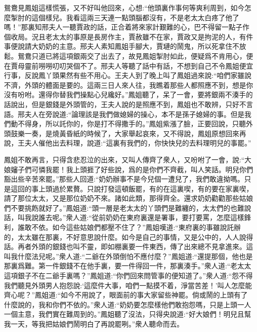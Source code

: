 \begin{parag}
    鴛鴦見鳳姐這樣慌張，又不好叫他回來，心想:“他頭裏作事何等爽利周到，如今怎麼掣肘的這個樣兒。我看這兩三天連一點頭腦都沒有，不是老太太白疼了他了嗎！”那裏知邢夫人一聽賈政的話，正合着將來家計艱難的心，巴不得留一點子作個收局。況且老太太的事原是長房作主，賈赦雖不在家，賈政又是拘泥的人，有件事便說請大奶奶的主意。邢夫人素知鳳姐手腳大，賈璉的鬧鬼，所以死拿住不放鬆。鴛鴦只道已將這項銀兩交了出去了，故見鳳姐掣肘如此，便疑爲不肯用心，便在賈母靈前嘮嘮叨叨哭個不了。邢夫人等聽了話中有話，不想到自己不令鳳姐便宜行事，反說鳳丫頭果然有些不用心。王夫人到了晚上叫了鳳姐過來說:“咱們家雖說不濟，外頭的體面是要的。這兩三日人來人往，我瞧着那些人都照應不到，想是你沒有吩咐。還得你替我們操點心兒纔好。”鳳姐聽了，呆了一會，要將銀兩不湊手的話說出，但是銀錢是外頭管的，王夫人說的是照應不到，鳳姐也不敢辨，只好不言語。邢夫人在旁說道:“論理該是我們做媳婦的操心，本不是孫子媳婦的事。但是我們動不得身，所以託你的，你是打不得撒手的。”鳳姐紫漲了臉，正要回說，只聽外頭鼓樂一奏，是燒黃昏紙的時候了，大家舉起哀來，又不得說，鳳姐原想回來再說，王夫人催他出去料理，說道:“這裏有我們的，你快快兒的去料理明兒的事罷。”
\end{parag}


\begin{parag}
    鳳姐不敢再言，只得含悲忍泣的出來，又叫人傳齊了衆人，又吩咐了一會，說:“大娘嬸子們可憐我罷！我上頭捱了好些說，爲的是你們不齊截，叫人笑話。明兒你們豁出些辛苦來罷。”那些人回道:“奶奶辦事不是今兒個一遭兒了，我們敢違拗嗎。只是這回的事上頭過於累贅。只說打發這頓飯罷，有的在這裏喫，有的要在家裏喫，請了那位太太，又是那位奶奶不來。諸如此類，那得齊全。還求奶奶勸勸那些姑娘們不要挑飭就好了。”鳳姐道:“頭一層是老太太的丫頭們是難纏的，太太們的也難說話，叫我說誰去呢。”衆人道:“從前奶奶在東府裏還是署事，要打要罵，怎麼這樣鋒利，誰敢不依。如今這些姑娘們都壓不住了？”鳳姐嘆道:“東府裏的事雖說託辦的，太太雖在那裏，不好意思說什麼。如今是自己的事情，又是公中的，人人說得話。再者外頭的銀錢也叫不靈，即如棚裏要一件東西，傳了出來總不見拿進來。這叫我什麼法兒呢。”衆人道:“二爺在外頭倒怕不應付麼？”鳳姐道:“還提那個，他也是那裏爲難。第一件銀錢不在他手裏，要一件得回一件，那裏湊手。”衆人道:“老太太這項銀子不在二爺手裏嗎？”鳳姐道:“你們回來問管事的便知道了。”衆人道:“怨不得我們聽見外頭男人抱怨說:‘這麼件大事，咱們一點摸不着，淨當苦差！’叫人怎麼能齊心呢？”鳳姐道:“如今不用說了，眼面前的事大家留些神罷。倘或鬧的上頭有了什麼說的，我和你們不依的。”衆人道:“奶奶要怎麼樣他們敢抱怨嗎，只是上頭一人一個主意，我們實在難周到的。”鳳姐聽了沒法，只得央說道:“好大娘們！明兒且幫我一天，等我把姑娘們鬧明白了再說罷咧。”衆人聽命而去。
\end{parag}


